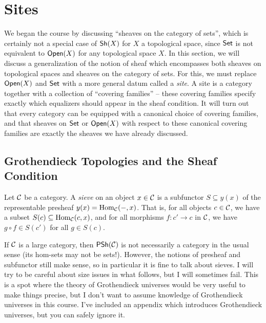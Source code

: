 \section{Sites}

We began the course by discussing ``sheaves on the category of sets'', which is certainly not a special case of $\mathsf{Sh}(X)$ for $X$ a topological space, since $\mathsf{Set}$ is not equivalent to $\mathsf{Open}(X)$ for any topological space $X$. In this section, we will discuss a generalization of the notion of sheaf which encompasses both sheaves on topological spaces and sheaves on the category of sets. For this, we must replace $\mathsf{Open}(X)$ and $\mathsf{Set}$ with a more general datum called a \emph{site}. A site is a category together with a collection of ``covering families'' -- these covering families specify exactly which equalizers should appear in the sheaf condition. It will turn out that every category can be equipped with a canonical choice of covering families, and that sheaves on $\mathsf{Set}$ or $\mathsf{Open}(X)$ with respect to these canonical covering families are exactly the sheaves we have already discussed.

\subsection{Grothendieck Topologies and the Sheaf Condition}

\begin{definition}\label{def:chap:sheaves:sec:sites:sieve}
    Let $\mathcal{C}$ be a category. A \emph{sieve} on an object $x \in \mathcal{C}$ is a subfunctor $S \subseteq y(x)$ of the representable presheaf $y(x) = \operatorname{Hom}_{\mathcal{C}}({-},x)$. That is, for all objects $c \in \mathcal{C}$, we have a subset $S(c) \subseteq \operatorname{Hom}_{\mathcal{C}}(c,x)$, and for all morphisms $f : c' \to c$ in $\mathcal{C}$, we have $g \circ f \in S(c')$ for all $g \in S(c)$.
\end{definition}

\begin{warning}
    If $\mathcal{C}$ is a large category, then $\mathsf{PSh}(\mathcal{C})$ is not necessarily a category in the usual sense (its hom-sets may not be sets!). However, the notions of presheaf and subfunctor still make sense, so in particular it is fine to talk about sieves. I will try to be careful about size issues in what follows, but I will sometimes fail. This is a spot where the theory of Grothendieck universes would be very useful to make things precise, but I don't want to assume knowledge of Grothendieck universes in this course. I've included an appendix  which introduces Grothendieck universes, but you can safely ignore it.
\end{warning}

